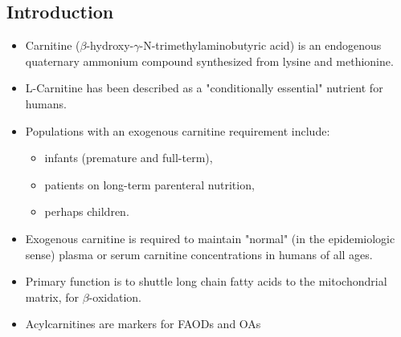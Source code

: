 \documentclass{scrartcl}
\begin{document}
\subsection{Introduction}
\label{sec:orgdef1ba0}
\begin{itemize}
\item Carnitine (\(\beta\)-hydroxy-\(\gamma\)-N-trimethylaminobutyric acid) is
an endogenous quaternary ammonium compound synthesized from lysine
and methionine.
\item L-Carnitine has been described as a "conditionally essential"
nutrient for humans.
\item Populations with an exogenous carnitine requirement include:
\begin{itemize}
\item infants (premature and full-term),
\item patients on long-term parenteral nutrition,
\item perhaps children.
\end{itemize}
\item Exogenous carnitine is required to maintain "normal" (in the
epidemiologic sense) plasma or serum carnitine concentrations in
humans of all ages.
\item Primary function is to shuttle long chain fatty acids to the
mitochondrial matrix, for \(\beta\)-oxidation.
\item Acylcarnitines are markers for FAODs and OAs
\end{itemize}

\vspace{2em}

\hspace{3em}
\end{document}
